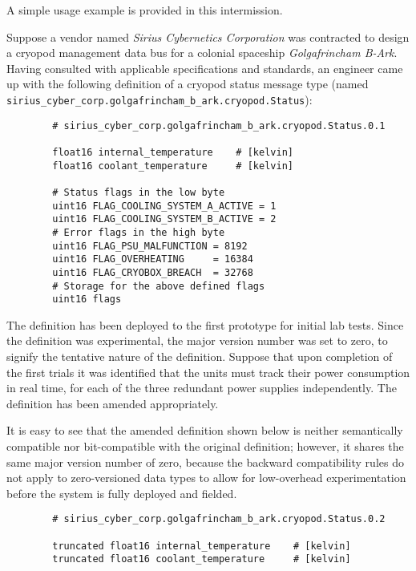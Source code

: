 \begin{remark}[breakable]
    A simple usage example is provided in this intermission.

    Suppose a vendor named \emph{Sirius Cybernetics Corporation} was contracted to design a
    cryopod management data bus for a colonial spaceship \emph{Golgafrincham B-Ark}.
    Having consulted with applicable specifications and standards, an engineer came up with the following
    definition of a cryopod status message type (named \verb|sirius_cyber_corp.golgafrincham_b_ark.cryopod.Status|):

    \begin{verbatim}
        # sirius_cyber_corp.golgafrincham_b_ark.cryopod.Status.0.1

        float16 internal_temperature    # [kelvin]
        float16 coolant_temperature     # [kelvin]

        # Status flags in the low byte
        uint16 FLAG_COOLING_SYSTEM_A_ACTIVE = 1
        uint16 FLAG_COOLING_SYSTEM_B_ACTIVE = 2
        # Error flags in the high byte
        uint16 FLAG_PSU_MALFUNCTION = 8192
        uint16 FLAG_OVERHEATING     = 16384
        uint16 FLAG_CRYOBOX_BREACH  = 32768
        # Storage for the above defined flags
        uint16 flags
    \end{verbatim}

    The definition has been deployed to the first prototype for initial lab tests.
    Since the definition was experimental, the major version number was set to zero, to signify the
    tentative nature of the definition.
    Suppose that upon completion of the first trials it was identified that the units must track their power consumption
    in real time, for each of the three redundant power supplies independently.
    The definition has been amended appropriately.

    It is easy to see that the amended definition shown below is neither semantically compatible nor bit-compatible
    with the original definition; however, it shares the same major version number of zero, because the backward
    compatibility rules do not apply to zero-versioned data types to allow for low-overhead experimentation
    before the system is fully deployed and fielded.

    \begin{verbatim}
        # sirius_cyber_corp.golgafrincham_b_ark.cryopod.Status.0.2

        truncated float16 internal_temperature    # [kelvin]
        truncated float16 coolant_temperature     # [kelvin]


\end{verbatim}
\end{remark}
